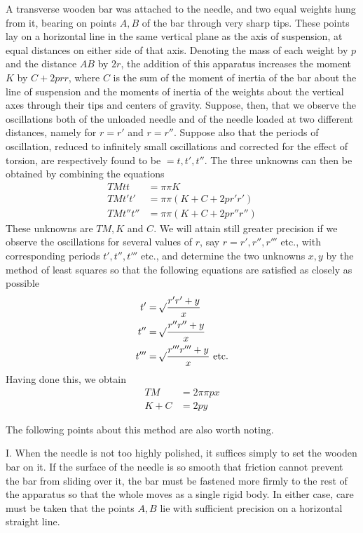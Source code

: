 A transverse wooden bar was attached to the needle, and two equal weights hung from it, bearing on points $A,B$ of the bar through very sharp tips. These points lay on a horizontal line in the same vertical plane as the axis of suspension, at equal distances on either side of that axis. Denoting the mass of each weight by $p$ and the distance $AB$ by $2r$, the addition of this apparatus increases the moment $K$ by $C+2prr$, where $C$ is the sum of the moment of inertia of the bar about the line of suspension and the moments of inertia of the weights about the vertical axes through their tips and centers of gravity. Suppose, then, that we observe the oscillations both of the unloaded needle and of the needle loaded at two different distances, namely for $r=r'$ and $r=r''$. Suppose also that the periods of oscillation, reduced to infinitely small oscillations and corrected for the effect of torsion, are respectively found to be $=t,t',t''$. The three unknowns can then be obtained by combining the equations
\[
\begin{aligned}
TMtt&=\pi\pi K\\
TMt't'&=\pi\pi(K+C+2pr'r')\\
TMt''t''&=\pi\pi(K+C+2pr''r'')
\end{aligned}
\]
These unknowns are $TM,K$ and $C$. We will attain still greater precision if we observe the oscillations for several values of $r$, say $r=r',r'',r'''$ etc., with corresponding periods $t',t'',t'''$ etc., and determine the two unknowns $x,y$ by the method of least squares so that the following equations are satisfied as closely as possible
\[
\begin{aligned}
t'&=\mathord{{}^{}\!\surd}\frac{r'r'+y}{x}\\
t''&=\mathord{{}^{}\!\surd}\frac{r''r''+y}{x}\\
t'''&=\mathord{{}^{}\!\surd}\frac{r'''r'''+y}{x}\ \text{etc.}
\end{aligned}
\]
Having done this, we obtain
\[
\begin{aligned}
TM&=2\pi\pi px\\
K+C&=2py
\end{aligned}
\]

The following points about this method are also worth noting.

I. When the needle is not too highly polished, it suffices simply to set the wooden bar on it. If the surface of the needle is so smooth that friction cannot prevent the bar from sliding over it, the bar must be fastened more firmly to the rest of the apparatus so that the whole moves as a single rigid body. In either case, care must be taken that the points $A,B$ lie with sufficient precision on a horizontal straight line.

